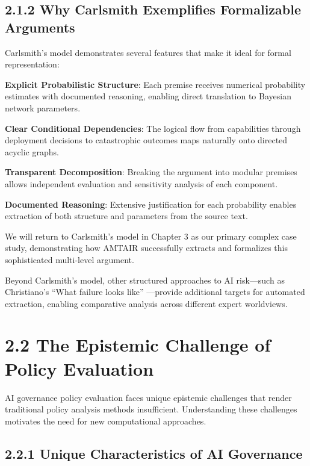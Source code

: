 \documentclass[
  11pt,
  letterpaper,
]{book}
\begin{document}
\subsection{2.1.2 Why Carlsmith Exemplifies Formalizable
Arguments}\label{why-carlsmith-exemplifies-formalizable-arguments}

Carlsmith's model demonstrates several features that make it ideal for
formal representation:

\textbf{Explicit Probabilistic Structure}: Each premise receives
numerical probability estimates with documented reasoning, enabling
direct translation to Bayesian network parameters.

\textbf{Clear Conditional Dependencies}: The logical flow from
capabilities through deployment decisions to catastrophic outcomes maps
naturally onto directed acyclic graphs.

\textbf{Transparent Decomposition}: Breaking the argument into modular
premises allows independent evaluation and sensitivity analysis of each
component.

\textbf{Documented Reasoning}: Extensive justification for each
probability enables extraction of both structure and parameters from the
source text.

We will return to Carlsmith's model in Chapter 3 as our primary complex
case study, demonstrating how AMTAIR successfully extracts and
formalizes this sophisticated multi-level argument.

Beyond Carlsmith's model, other structured approaches to AI risk---such
as Christiano's ``What failure looks like''
\textcite{christiano2019}---provide additional targets for automated
extraction, enabling comparative analysis across different expert
worldviews.

\section{2.2 The Epistemic Challenge of Policy
Evaluation}\label{the-epistemic-challenge-of-policy-evaluation}

AI governance policy evaluation faces unique epistemic challenges that
render traditional policy analysis methods insufficient. Understanding
these challenges motivates the need for new computational approaches.

\subsection{2.2.1 Unique Characteristics of AI
Governance}\label{unique-characteristics-of-ai-governance}
\end{document}
